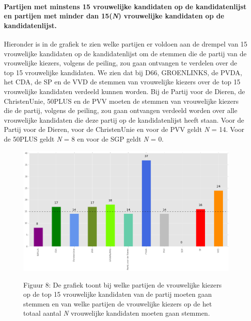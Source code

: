 \paragraph{Partijen met minstens 15 vrouwelijke kandidaten op de kandidatenlijst en partijen met minder dan 15(\textit{N}) vrouwelijke kandidaten op de kandidatenlijst.}
Hieronder is in de grafiek te zien welke partijen er voldoen aan de drempel van 15 vrouwelijke kandidaten op de kandidatenlijst om de stemmen die de partij van de vrouwelijke kiezers, volgens de peiling, zou gaan ontvangen te verdelen over de top 15 vrouwelijke kandidaten. We zien dat bij D66, GROENLINKS, de PVDA, het CDA, de SP en de VVD de stemmen van vrouwelijke kiezers over de top 15 vrouwelijke kandidaten verdeeld kunnen worden. Bij de Partij voor de Dieren, de ChristenUnie, 50PLUS en de PVV moeten de stemmen van vrouwelijke kiezers die de partij, volgens de peiling, zou gaan ontvangen verdeeld worden over alle vrouwelijke kandidaten die deze partij op de kandidatenlijst heeft staan. Voor de Partij voor de Dieren, voor de ChristenUnie en voor de PVV geldt \textit{N} = 14. Voor de 50PLUS geldt \textit{N} = 8 en voor de SGP geldt \textit{N} = 0. 

\begin{figure}[H]
\begin{center}
	\includegraphics[width=\linewidth]	{top15_of_topN_kandidaten.png}
		\begin{center}
			Figuur 8: De grafiek toont bij welke partijen de vrouwelijke kiezers op de top 15 vrouwelijke kandidaten van de partij moeten gaan stemmen en van welke partijen de vrouwelijke kiezers op de het totaal aantal \textit{N} vrouwelijke kandidaten moeten gaan stemmen.   
		\end{center}
\end{center}
\end{figure}

